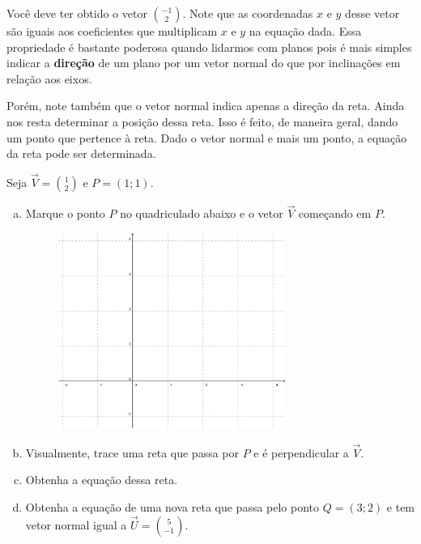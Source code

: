 \documentclass[main.tex]{subfiles}
\begin{document}
Você deve ter obtido o vetor $\binom{-1}{2}$. Note que as coordenadas $x$ e $y$ desse vetor são iguais aos coeficientes que multiplicam $x$ e $y$ na equação dada. Essa propriedade é bastante poderosa quando lidarmos com planos pois é mais simples indicar a \textbf{direção} de um plano por um vetor normal do que por inclinações em relação aos eixos.

Porém, note também que o vetor normal indica apenas a direção da reta. Ainda nos resta determinar a posição dessa reta. Isso é feito, de maneira geral, dando um ponto que pertence à reta. Dado o vetor normal e mais um ponto, a equação da reta pode ser determinada. 

\begin{questao}
Seja $\overrightarrow{V}=\binom{1}{2}$ e $P=(1;1)$.
\begin{enumerate}[a)]
\item Marque o ponto $P$ no quadriculado abaixo e o vetor $\overrightarrow{V}$ começando em $P$.

\begin{figure}[h]
\centering
\includegraphics[width=0.7\textwidth]{./img/c6q9.png}
\end{figure}

\item Visualmente, trace uma reta que passa por $P$ e é perpendicular a $\overrightarrow{V}$.
\item Obtenha a equação dessa reta.
\item Obtenha a equação de uma nova reta que passa pelo ponto $Q=(3;2)$ e tem vetor normal igual a $\overrightarrow{U}=\binom{5}{-1}$.
\end{enumerate}
\end{questao}

\end{document}

